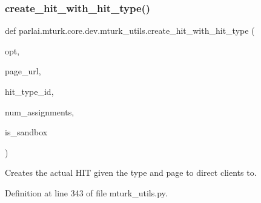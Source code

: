 \mbox{\label{namespaceparlai_1_1mturk_1_1core_1_1dev_1_1mturk__utils_a471ced1f7df897dcf3414dd49b84ddeb}} 
\subsubsection{\texorpdfstring{create\+\_\+hit\+\_\+with\+\_\+hit\+\_\+type()}{create\_hit\_with\_hit\_type()}}
{\footnotesize\ttfamily def parlai.\+mturk.\+core.\+dev.\+mturk\+\_\+utils.\+create\+\_\+hit\+\_\+with\+\_\+hit\+\_\+type (\begin{DoxyParamCaption}\item[{}]{opt,  }\item[{}]{page\+\_\+url,  }\item[{}]{hit\+\_\+type\+\_\+id,  }\item[{}]{num\+\_\+assignments,  }\item[{}]{is\+\_\+sandbox }\end{DoxyParamCaption})}

\begin{DoxyVerb}Creates the actual HIT given the type and page to direct clients to.
\end{DoxyVerb}
 

Definition at line 343 of file mturk\+\_\+utils.\+py.


